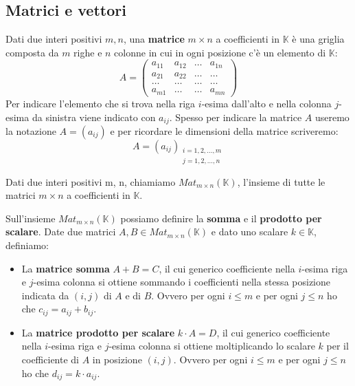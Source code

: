 

\subsection{Matrici e vettori}

\begin{defn}
	Dati due interi positivi $m, n$, una \textbf{matrice} $m \times n$
	a coefficienti in $\mathbb{K}$ \`e una griglia composta da $m$ righe
	e $n$ colonne in cui in ogni posizione c'\`e un elemento di
	$\mathbb{K}$:
	\begin{equation*}
		A = \begin{pmatrix}
			a_{11} & a_{12} & \dots & a_{1n} \\
			a_{21} & a_{22} & \dots & \dots  \\
			\dots  & \dots  & \dots & \dots  \\
			a_{m1} & \dots  & \dots & a_{mn}
		\end{pmatrix}
	\end{equation*}
	Per indicare l'elemento che si trova nella riga $i$-esima
	dall'alto e	nella colonna $j$-esima da sinistra viene indicato
	con $a_{ij}$. Spesso per indicare la matrice $A$ useremo la notazione
	$A = (a_{ij})$ e per ricordare le dimensioni della matrice scriveremo:
	\begin{equation*}
		A = (a_{ij})_{\substack{
					i = 1, 2, \dots, m \\
					j = 1, 2, \dots, n
				}}
	\end{equation*}
\end{defn}

\begin{defn}
	Dati due interi positivi m, n, chiamiamo
	$Mat_{m \times n} (\mathbb{K})$, l'insieme di tutte le matrici
	$m \times n$ a coefficienti in $\mathbb{K}$.
\end{defn}

\begin{defn}
	Sull'insieme $Mat_{m \times n} (\mathbb{K})$ possiamo definire la
	\textbf{somma} e il \textbf{prodotto per scalare}. Date due matrici
	$A, B \in Mat_{m \times n} (\mathbb{K})$ e dato uno scalare
	$k \in \mathbb{K}$, definiamo:
	\begin{itemize}
		\item
		      La \textbf{matrice somma} $A + B = C$, il cui generico coefficiente nella
		      $i$-esima riga e $j$-esima colonna si ottiene sommando i
		      coefficienti nella stessa posizione indicata da $(i, j)$ di $A$ e
		      di $B$. Ovvero per ogni $i \leq m$ e per ogni $j \leq n$
		      ho che $c_{ij} = a_{ij} + b_{ij}$.
		\item
		      La \textbf{matrice prodotto per scalare} $k \cdot A = D$, il cui
		      generico coefficiente nella $i$-esima riga e $j$-esima
		      colonna si ottiene moltiplicando lo scalare $k$ per il
		      coefficiente di $A$ in posizione $(i, j)$. Ovvero per ogni
		      $i \leq m$ e per ogni $j \leq n$ ho che
		      $d_{ij} = k \cdot a_{ij}$.
	\end{itemize}
\end{defn}

